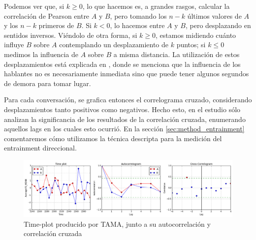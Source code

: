 Podemos ver que, si $k \geq 0$, lo que hacemos es, a grandes rasgos, calcular la correlación de Pearson entre $A$ y $B$, pero tomando los $n-k$ últimos valores de $A$ y los $n-k$ primeros de $B$. Si $k < 0$, lo hacemos entre $A$ y $B$, pero desplazando en sentidos inversos. Viéndolo de otra forma, si $k \geq 0$, estamos midiendo cuánto influye $B$ sobre $A$ contemplando un desplazamiento de $k$ puntos; si $k \leq 0$ medimos la influencia de $A$ sobre $B$ a misma distancia. La utilización de estos desplazamientos está explicada en \cite{gravano2015backward}, donde se menciona que la influencia de los hablantes no es necesariamente inmediata sino que puede tener algunos segundos de demora para tomar lugar.


Para cada conversación, se grafica entonces el correlograma cruzado, considerando desplazamientos tanto positivos como negativos. Hecho esto, en el estudio \cite{KOU2008.2} sólo analizan la significancia de los resultados de la correlación cruzada, enumerando aquellos lags en los cuales esto ocurrió. En la sección \ref{sec:method_entrainment} comentaremos cómo utilizamos la técnica descripta para la medición del entrainment direccional.

\begin{figure}
\centering
\includegraphics[width=15cm]{images/time_plot_with_cross_correlation.png}
\caption{Time-plot producido por TAMA, junto a su autocorrelación y correlación cruzada}
\end{figure}
